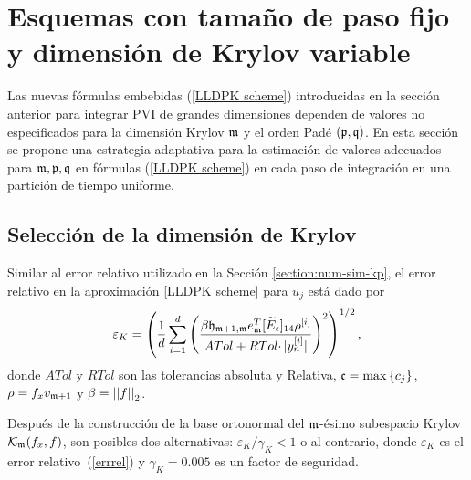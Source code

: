 \section{Esquemas con tamaño de paso fijo y dimensión de Krylov variable}\label{section:lldp-fix-step}

Las nuevas fórmulas embebidas (\ref{LLDPK scheme}) introducidas en la sección anterior para integrar PVI de grandes dimensiones
dependen de valores no especificados para la dimensión Krylov $\mathfrak{m}$ y el orden Padé $(\mathfrak{p} ,\mathfrak{q})$. En esta sección se propone una estrategia adaptativa para la estimación de valores adecuados para $\mathfrak{m}, \mathfrak{p} ,\mathfrak{q}$ en fórmulas (\ref{LLDPK scheme}) en cada paso de integración en una partición de tiempo uniforme.

\subsection{Selección de la dimensión de Krylov}\label{sec:selkrydim}

Similar al error relativo utilizado en la Sección \ref{section:num-sim-kp}, el error relativo en la aproximación \ref{LLDPK scheme} para $u_j$ está dado por
\begin{equation}
    \varepsilon_{K} = \left(\frac{1}{d}\sum\limits_{i=1}^{d} \left(\frac{\beta
        \mathfrak{h}_{\mathfrak{m}+1,\mathfrak{m}} e_{\mathfrak{m}}^T
        [\widetilde{E}_\mathfrak{c}]_{14} \rho^{[i]}}{ATol+ RTol\cdotp
        \rvert y_{n}^{[i]}\rvert}\right)^{2}\right)^{1/2},
    \label{errrel}
\end{equation}
donde $ATol$ y $RTol$ son las tolerancias absoluta y Relativa, $\mathfrak{c}=\max\left\{ c_j \right\}$, $\rho = f_x v_{\mathfrak{m}+1}$ y $\beta=\left\lvert \left\lvert f \right\rvert \right\rvert_2$.

Después de la construcción de la base ortonormal del $\mathfrak{m}$-ésimo subespacio Krylov $\mathcal{K}_{\mathfrak{m}}(f_x,f)$, son posibles dos alternativas: $\varepsilon_{K}/\gamma_{K}< 1$ o al contrario, donde $\varepsilon_{K}$
es el error relativo~(\ref{errrel}) y $\gamma_{K}=0.005$ es un factor de seguridad.


